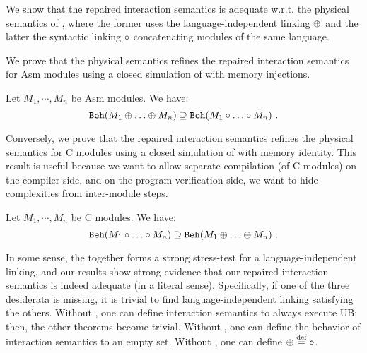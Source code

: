 

We show that the repaired interaction semantics is adequate w.r.t. the physical semantics of \cc{},
where the former uses the language-independent linking $\oplus$ and the latter the syntactic linking $\circ$
concatenating modules of the same language.

We prove that the physical semantics refines the repaired interaction semantics for \textrm{Asm} modules
using a closed simulation of \cc{} with memory injections.
\begin{theorem}\label{thm:results-adequacy-asm}
  Let $M_1, \cdots, M_n$ be \textrm{Asm} modules.  We have:
  \[   \mathtt{Beh}({M_1 \oplus \ldots \oplus M_n}) \supseteq  \mathtt{Beh}({M_1 \circ \ldots \circ M_n}) ~.\]
\end{theorem}
\noindent
{}



Conversely, we prove that the repaired interaction semantics refines the physical semantics for \textrm{\cc{} C} modules
using a closed simulation of \cc{} with memory identity.
This result is useful because we want to allow separate compilation (of C modules) on the compiler side, and on the program verification side, we want to hide complexities from inter-module steps.
\begin{theorem}[Adequacy w.r.t C]\label{thm:results-adequacy-c}
  Let $M_1, \cdots, M_n$ be \textrm{\cc{} C} modules.  We have:
  \[  \mathtt{Beh}({M_1 \circ \ldots \circ M_n}) \supseteq \mathtt{Beh}({M_1 \oplus \ldots \oplus M_n})  ~.\]
\end{theorem}


In some sense, the  together forms a strong stress-test for a language-independent linking, and our results show strong evidence that our repaired interaction semantics is indeed adequate (in a literal sense).
Specifically, if one of the three desiderata is missing, it is trivial to find language-independent linking satisfying the others.
Without , one can define interaction semantics to always execute UB; then, the other theorems become trivial.
Without , one can define the behavior of interaction semantics to an empty set.
Without , one can define $\oplus \stackrel{\text{def}}{=} \circ$.

